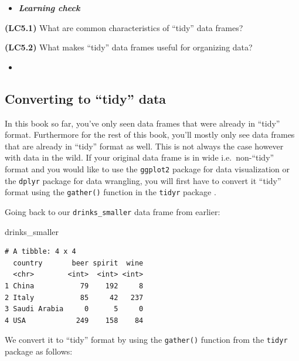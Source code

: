\documentclass[12pt, krantz2,]{krantz}
\makeatletter
\newenvironment{Shaded}{\begin{snugshade}}{\end{snugshade}}
\newcommand{\DataTypeTok}[1]{\textcolor[rgb]{0.27,0.27,0.27}{#1}}
\newcommand{\KeywordTok}[1]{\textcolor[rgb]{0.27,0.27,0.27}{\textbf{#1}}}
\newcommand{\NormalTok}[1]{#1}
\newcommand{\OperatorTok}[1]{\textcolor[rgb]{0.43,0.43,0.43}{\textbf{#1}}}
\newcommand{\StringTok}[1]{\textcolor[rgb]{0.5,0.5,0.5}{#1}}
\newenvironment{kframe}{%
\medskip{}
\setlength{\fboxsep}{.8em}
 \def\at@end@of@kframe{}%
 \ifinner\ifhmode%
  \def\at@end@of@kframe{\end{minipage}}%
  \begin{minipage}{\columnwidth}%
 \fi\fi%
 \def\FrameCommand##1{\hskip\@totalleftmargin \hskip-\fboxsep
 \colorbox{shadecolor}{##1}\hskip-\fboxsep
     \hskip-\linewidth \hskip-\@totalleftmargin \hskip\columnwidth}%
 \MakeFramed {\advance\hsize-\width
   \@totalleftmargin\z@ \linewidth\hsize
   \@setminipage}}%
 {\par\unskip\endMakeFramed%
 \at@end@of@kframe}
\renewenvironment{Shaded}{\begin{kframe}}{\end{kframe}}
\newenvironment{rmdblock}[1]
  {\begin{shaded*}
  \begin{itemize}
  \renewcommand{\labelitemi}{
    \raisebox{-.7\height}[0pt][0pt]{
    }
  }
  \item
  }
  {
  \end{itemize}
  \end{shaded*}
  }
\newenvironment{learncheck}
  {\begin{rmdblock}{warning}}
  {\end{rmdblock}}
\makeatother
\begin{document}
\begin{learncheck}
\textbf{\emph{Learning check}}
\end{learncheck}

\textbf{(LC5.1)} What are common characteristics of ``tidy'' data frames?

\textbf{(LC5.2)} What makes ``tidy'' data frames useful for organizing data?

\begin{learncheck}

\end{learncheck}

\hypertarget{converting-to-tidy-data}{%
\subsection{Converting to ``tidy'' data}\label{converting-to-tidy-data}}

In this book so far, you've only seen data frames that were already in ``tidy'' format. Furthermore for the rest of this book, you'll mostly only see data frames that are already in ``tidy'' format as well. This is not always the case however with data in the wild. If your original data frame is in wide i.e.~non-``tidy'' format and you would like to use the \texttt{ggplot2} package for data visualization or the \texttt{dplyr} package for data wrangling, you will first have to convert it ``tidy'' format using the \texttt{gather()} function in the \texttt{tidyr} package \citep{R-tidyr}.

Going back to our \texttt{drinks\_smaller} data frame from earlier:

\begin{Shaded}
\begin{Highlighting}[]
\NormalTok{drinks_smaller}
\end{Highlighting}
\end{Shaded}

\begin{verbatim}
# A tibble: 4 x 4
  country       beer spirit  wine
  <chr>        <int>  <int> <int>
1 China           79    192     8
2 Italy           85     42   237
3 Saudi Arabia     0      5     0
4 USA            249    158    84
\end{verbatim}

We convert it to ``tidy'' format by using the \texttt{gather()} function from the \texttt{tidyr} package as follows:

\begin{Shaded}
\end{Shaded}
\end{document}
